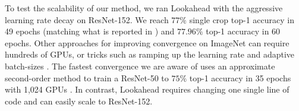 To test the scalability of our method, we ran Lookahead with the aggressive learning rate decay on ResNet-152. We reach $77\%$ single crop top-1 accuracy in 49 epochs (matching what is reported in \citet{he2016deep}) and $77.96\%$ top-1 accuracy in 60 epochs. Other approaches for improving convergence on ImageNet can require hundreds of GPUs, or tricks such as ramping up the learning rate and adaptive batch-sizes \citep{goyal2017accurate, jia2018highly}. The fastest convergence we are aware of uses an approximate second-order method to train a ResNet-50 to $75\%$ top-1 accuracy in 35 epochs with 1,024 GPUs \citep{1811.12019}. In contrast, Lookahead requires changing one single line of code and can easily scale to ResNet-152. 